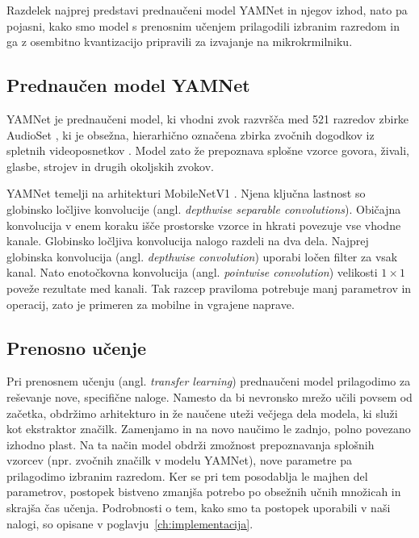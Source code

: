 Razdelek najprej predstavi prednaučeni model YAMNet in njegov izhod, nato pa
pojasni, kako smo model s prenosnim učenjem prilagodili izbranim razredom in ga z
osembitno kvantizacijo pripravili za izvajanje na mikrokrmilniku.

\subsection{Prednaučen model YAMNet}

YAMNet je prednaučeni model, ki vhodni zvok razvršča med 521 razredov zbirke
AudioSet \cite{hershey2017cnn,tensorflowyamnetrepo}, ki je obsežna,
hierarhično označena zbirka zvočnih dogodkov iz spletnih videoposnetkov
\cite{gemmeke2017audioset}. Model zato že prepoznava splošne vzorce govora,
živali, glasbe, strojev in drugih okoljskih zvokov.

YAMNet temelji na arhitekturi MobileNetV1 \cite{howard2017mobilenets}. Njena
ključna lastnost so globinsko ločljive konvolucije (angl. \emph{depthwise
separable convolutions}). Običajna konvolucija v enem koraku išče prostorske
vzorce in hkrati povezuje vse vhodne kanale. Globinsko ločljiva konvolucija
nalogo razdeli na dva dela. Najprej globinska konvolucija (angl.
\emph{depthwise convolution}) uporabi ločen filter za vsak kanal. Nato
enotočkovna konvolucija (angl. \emph{pointwise convolution}) velikosti
$1\times1$ poveže rezultate med kanali. Tak razcep praviloma potrebuje manj
parametrov in operacij, zato je primeren za mobilne in vgrajene naprave.

\subsection{Prenosno učenje}

Pri prenosnem učenju (angl. \emph{transfer learning}) prednaučeni model prilagodimo 
za reševanje nove, specifične naloge. Namesto da bi nevronsko mrežo učili povsem od 
začetka, obdržimo arhitekturo in že naučene uteži večjega dela modela, ki služi kot 
ekstraktor značilk. Zamenjamo in na novo naučimo le zadnjo, polno povezano izhodno 
plast. Na ta način model obdrži zmožnost prepoznavanja splošnih vzorcev (npr. zvočnih 
značilk v modelu YAMNet), nove parametre pa prilagodimo izbranim razredom. Ker se pri 
tem posodablja le majhen del parametrov, postopek bistveno zmanjša potrebo po obsežnih 
učnih množicah in skrajša čas učenja. Podrobnosti o tem, kako smo ta postopek uporabili 
v naši nalogi, so opisane v poglavju~\ref{ch:implementacija}.

